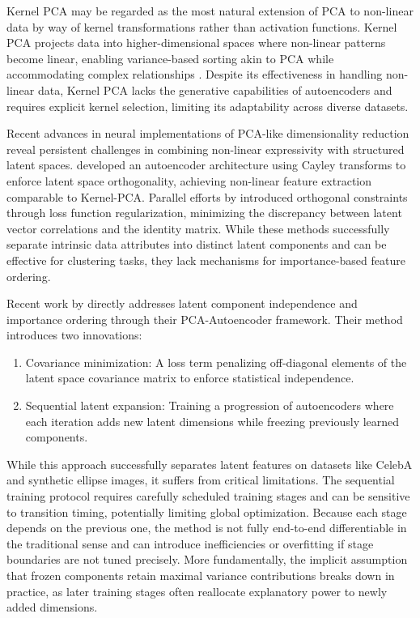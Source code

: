 \documentclass[twoside,11pt]{article}
\begin{document}
Kernel PCA may be regarded as the most natural extension of PCA to non-linear data by way of kernel transformations rather than activation functions. Kernel PCA projects data into higher-dimensional spaces where non-linear patterns become linear, enabling variance-based sorting akin to PCA while accommodating complex relationships \cite{pei2018study, majumdar2021kernelized, pei2017autoencoder}. Despite its effectiveness in handling non-linear data, Kernel PCA lacks the generative capabilities of autoencoders and requires explicit kernel selection, limiting its adaptability across diverse datasets.

Recent advances in neural implementations of PCA-like dimensionality reduction reveal persistent challenges in combining non-linear expressivity with structured latent spaces. \cite{ren2024learnable} developed an autoencoder architecture using Cayley transforms to enforce latent space orthogonality, achieving non-linear feature extraction comparable to Kernel-PCA. Parallel efforts by \cite{wang2019clustering} introduced orthogonal constraints through loss function regularization, minimizing the discrepancy between latent vector correlations and the identity matrix. While these methods successfully separate intrinsic data attributes into distinct latent components and can be effective for clustering tasks, they lack mechanisms for importance-based feature ordering.

Recent work by \cite{pham2022pca} directly addresses latent component independence and importance ordering through their PCA-Autoencoder framework. Their method introduces two innovations:
\begin{enumerate}
    \item Covariance minimization: A loss term penalizing off-diagonal elements of the latent space covariance matrix to enforce statistical independence.
    \item Sequential latent expansion: Training a progression of autoencoders where each iteration adds new latent dimensions while freezing previously learned components.
\end{enumerate}

While this approach successfully separates latent features on datasets like CelebA and synthetic ellipse images, it suffers from critical limitations. The sequential training protocol requires carefully scheduled training stages and can be sensitive to transition timing, potentially limiting global optimization. Because each stage depends on the previous one, the method is not fully end-to-end differentiable in the traditional sense and can introduce inefficiencies or overfitting if stage boundaries are not tuned precisely. More fundamentally, the implicit assumption that frozen components retain maximal variance contributions breaks down in practice, as later training stages often reallocate explanatory power to newly added dimensions.
\end{document}
